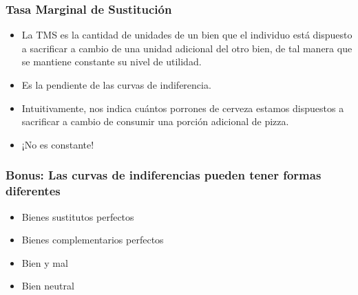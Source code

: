\documentclass{beamer}
\begin{document}
\begin{frame}
\frametitle{Tasa Marginal de Sustitución}
\begin{itemize}
    \item La TMS es la cantidad de unidades de un bien que el individuo está dispuesto a sacrificar a cambio de una unidad adicional del otro bien, de tal manera que se mantiene constante su nivel de utilidad.
    \item Es la pendiente de las curvas de indiferencia.
    \item Intuitivamente, nos indica cuántos porrones de cerveza estamos dispuestos a sacrificar a cambio de consumir una porción adicional de pizza.
    \item  ¡No es constante!
\end{itemize} 
\end{frame}

\begin{frame}
\frametitle{Bonus: Las curvas de indiferencias pueden tener formas diferentes}
\begin{itemize}
    \item Bienes sustitutos perfectos %
    \item Bienes complementarios perfectos %
    \item Bien y mal %
    \item Bien neutral %
\end{itemize} 
\end{frame}



\end{document}
